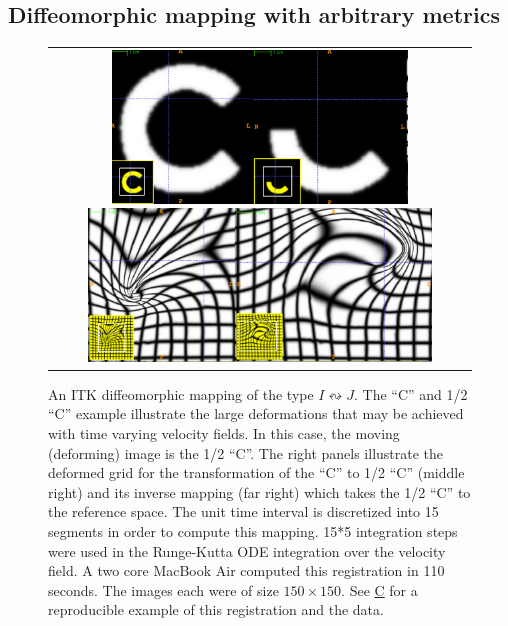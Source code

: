 \documentclass{frontiersSCNS}
\begin{document}
\subsection{Diffeomorphic mapping with arbitrary metrics}
\begin{figure}[t]
\begin{center}
\begin{tabular}{c}
\includegraphics[height=1.6in]{figs/c_chalf.pdf}
\includegraphics[height=1.6in]{figs/c_half_c_grids.pdf}
\end{tabular}
\caption{An ITK diffeomorphic mapping of the
  type $I \leftrightsquigarrow J $.  The 
``C'' and 1/2 ``C'' example illustrate the large deformations that may
be achieved with time varying velocity fields.  In this case, the moving (deforming) image is
the 1/2 ``C''.  The right panels illustrate the deformed grid for the
transformation of the ``C'' to 1/2 ``C'' (middle right) and its
inverse mapping (far right) which takes the 1/2 ``C'' to the reference
space.  The unit time interval is discretized into 15 segments in
order to compute this mapping.  15*5 integration steps were used in
the Runge-Kutta ODE integration over the velocity field.  A two
core MacBook Air computed this registration in 110 seconds.  The images
each were of size $150 \times 150$.  See
\href{http://stnava.github.io/C/}{C} for a reproducible example of
this registration and the data.}
\label{fig:chalf}
\end{center}
\end{figure}
\end{document}
